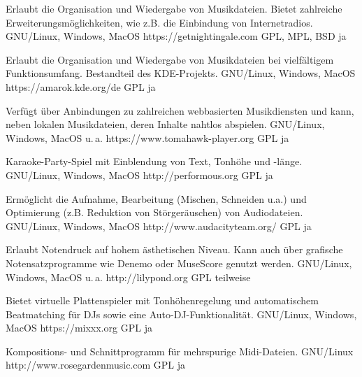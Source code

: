 






{Erlaubt die Organisation und Wiedergabe von Musikdateien. Bietet zahlreiche Erweiterungsmöglichkeiten, wie z.B. die Einbindung von Internetradios.}
{GNU/Linux, Windows, MacOS}
{https://getnightingale.com}
{GPL, MPL, BSD}
{ja}

{Erlaubt die Organisation und Wiedergabe von Musikdateien bei vielfältigem Funktionsumfang. Bestandteil des KDE-Projekts.}
{GNU/Linux, Windows, MacOS}
{https://amarok.kde.org/de}
{GPL}
{ja}

{Verfügt über Anbindungen zu zahlreichen webbasierten Musikdiensten und kann, neben lokalen Musikdateien, deren Inhalte nahtlos abspielen.}
{GNU/Linux, Windows, MacOS u.\,a.}
{https://www.tomahawk-player.org}
{GPL}
{ja}

{Karaoke-Party-Spiel mit Einblendung von Text, Tonhöhe und -länge.}
{GNU/Linux, Windows, MacOS}
{http://performous.org} %
{GPL}
{ja}


{Ermöglicht die Aufnahme, Bearbeitung (Mischen, Schneiden u.a.) und Optimierung (z.B. Reduktion von Störgeräuschen) von Audiodateien.}
{GNU/Linux, Windows, MacOS}
{http://www.audacityteam.org/} %
{GPL}
{ja}

{Erlaubt Notendruck auf hohem ästhetischen Niveau. Kann auch über grafische Notensatzprogramme wie Denemo oder MuseScore genutzt werden.}
{GNU/Linux, Windows, MacOS u.\,a.}
{http://lilypond.org} %
{GPL}
{teilweise}

{Bietet virtuelle Plattenspieler mit Tonhöhenregelung und automatischem Beatmatching für DJs sowie eine Auto-DJ-Funktionalität.}
{GNU/Linux, Windows, MacOS}
{https://mixxx.org}
{GPL}
{ja}

{Kompositions- und Schnittprogramm für mehrspurige Midi-Dateien.}
{GNU/Linux}
{http://www.rosegardenmusic.com} %
{GPL}
{ja}

\backpage


